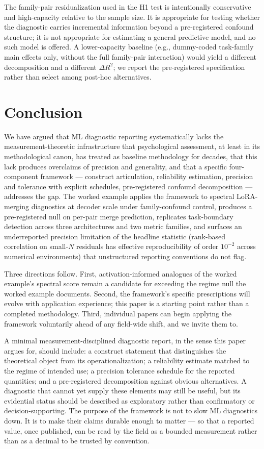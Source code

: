 \documentclass[10pt]{article}
\begin{document}
The family-pair residualization used in the H1 test is intentionally
conservative and high-capacity relative to the sample size. It is
appropriate for testing whether the diagnostic carries incremental
information beyond a pre-registered confound structure; it is not
appropriate for estimating a general predictive model, and no such
model is offered. A lower-capacity baseline (e.g., dummy-coded
task-family main effects only, without the full family-pair
interaction) would yield a different decomposition and a different
$\Delta R^2$; we report the pre-registered specification rather than
select among post-hoc alternatives.

\section{Conclusion}
\label{sec:conclusion}

We have argued that ML diagnostic reporting systematically lacks the
measurement-theoretic infrastructure that psychological assessment,
at least in its methodological canon, has treated as baseline
methodology for decades, that this lack produces overclaims of
precision and generality, and that a specific
four-component framework --- construct articulation, reliability
estimation, precision and tolerance with explicit schedules,
pre-registered confound decomposition --- addresses the gap.
The worked example applies the framework to spectral LoRA-merging
diagnostics at decoder scale under family-confound control,
produces a pre-registered null on per-pair merge prediction,
replicates task-boundary detection across three architectures and
two metric families, and surfaces an underreported precision
limitation of the headline statistic (rank-based correlation on
small-$N$ residuals has effective reproducibility of order $10^{-2}$
across numerical environments) that unstructured reporting conventions
do not flag.

Three directions follow. First, activation-informed analogues of the
worked example's spectral score remain a candidate for exceeding the
regime null the worked example documents. Second, the
framework's specific prescriptions will evolve with application
experience; this paper is a starting point rather than a completed
methodology. Third, individual papers can begin applying the
framework voluntarily ahead of any field-wide shift, and we invite
them to.

A minimal measurement-disciplined diagnostic report, in the sense
this paper argues for, should include: a construct statement that
distinguishes the theoretical object from its operationalization; a
reliability estimate matched to the regime of intended use; a
precision tolerance schedule for the reported quantities; and a
pre-registered decomposition against obvious alternatives. A
diagnostic that cannot yet supply these elements may still be useful,
but its evidential status should be described as exploratory rather
than confirmatory or decision-supporting. The purpose of the
framework is not to slow ML
diagnostics down. It is to make their claims durable enough to
matter --- so that a reported value, once published, can be read by
the field as a bounded measurement rather than as a decimal to be
trusted by convention.
\end{document}
